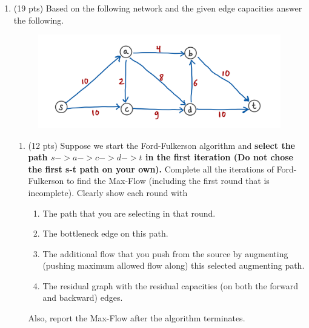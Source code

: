 \documentclass[12pt]{article}
\theoremstyle{remark}
\begin{document}
\hrulefill

\newpage
\begin{enumerate}




\item (19 pts) Based on the following network and the given edge capacities answer the following. 
\begin{figure}[h!]
\begin{center}
\includegraphics[scale=0.3]{Flow_6b.jpeg}
\end{center}
\end{figure}

\begin{enumerate}
\item (12 pts) Suppose we start the Ford-Fulkerson algorithm and \textbf{select the path $s->a->c->d->t$ in the first iteration (Do not chose the first s-t path on your own).} Complete all the iterations of Ford-Fulkerson to find the Max-Flow (including the first round that is incomplete).
Clearly show each round with \\
\begin{enumerate}
\item The path that you are selecting in that round.
\item The bottleneck edge on this path.
\item The additional flow that you push from the source by augmenting (pushing maximum allowed flow along) this selected augmenting path.
\item The residual graph with the residual capacities (on both the forward and backward) edges.
\end{enumerate}
Also, report the Max-Flow after the algorithm terminates.


\end{enumerate}
\end{enumerate}
\end{document}
